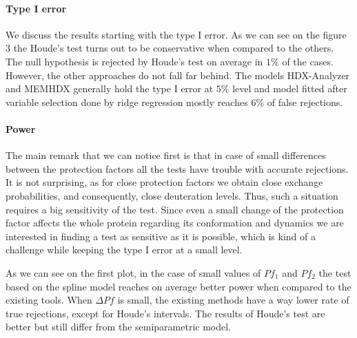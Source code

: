 \documentclass[]{MathAppl18}
\begin{document}
\paragraph{Type I error}

We discuss the results starting with the type I error. As we can see on the figure 3 the Houde's test turns out to be conservative when compared to the others. The null hypothesis is rejected by Houde's test on average in $1\%$ of the cases. However, the other approaches do not fall far behind. The models HDX-Analyzer and MEMHDX generally hold the type I error at $5\%$ level and model fitted after variable selection done by ridge regression mostly reaches $6\%$ of false rejections.

\paragraph{Power}

The main remark that we can notice first is that in case of small differences between the protection factors all the tests have trouble with accurate rejections. It is not surprising, as for close protection factors we obtain close exchange probabilities, and consequently, close deuteration levels. Thus, such a situation requires a big sensitivity of the test. Since even a small change of the protection factor affects the whole protein regarding its conformation and dynamics we are interested in finding a test as sensitive as it is possible, which is kind of a challenge while keeping the type I error at a small level.

As we can see on the first plot, in the case of small values of $Pf_1$ and $Pf_2$ the test based on the spline model reaches on average better power when compared to the existing tools. When $\Delta Pf$ is small, the existing methods have a way lower rate of true rejections, except for Houde's intervals. The results of Houde's test are better but still differ from the semiparametric model. 
\end{document}
